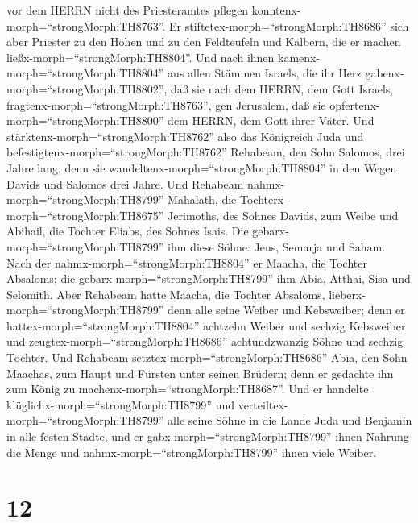 vor dem HERRN nicht des Priesteramtes pflegen
konntenx-morph=``strongMorph:TH8763''.  Er
stiftetex-morph=``strongMorph:TH8686'' sich aber Priester zu den Höhen
und zu den Feldteufeln und Kälbern, die er machen
ließx-morph=``strongMorph:TH8804''.  Und nach ihnen
kamenx-morph=``strongMorph:TH8804'' aus allen Stämmen Israels, die ihr
Herz gabenx-morph=``strongMorph:TH8802'', daß sie nach dem HERRN, dem
Gott Israels, fragtenx-morph=``strongMorph:TH8763'', gen Jerusalem, daß
sie opfertenx-morph=``strongMorph:TH8800'' dem HERRN, dem Gott ihrer
Väter.  Und stärktenx-morph=``strongMorph:TH8762'' also das
Königreich Juda und befestigtenx-morph=``strongMorph:TH8762'' Rehabeam,
den Sohn Salomos, drei Jahre lang; denn sie
wandeltenx-morph=``strongMorph:TH8804'' in den Wegen Davids und Salomos
drei Jahre.  Und Rehabeam
nahmx-morph=``strongMorph:TH8799'' Mahalath, die
Tochterx-morph=``strongMorph:TH8675'' Jerimoths, des Sohnes Davids, zum
Weibe und Abihail, die Tochter Eliabs, des Sohnes Isais. 
Die gebarx-morph=``strongMorph:TH8799'' ihm diese Söhne: Jeus, Semarja
und Saham.  Nach der nahmx-morph=``strongMorph:TH8804'' er
Maacha, die Tochter Absaloms; die gebarx-morph=``strongMorph:TH8799''
ihm Abia, Atthai, Sisa und Selomith.  Aber Rehabeam hatte
Maacha, die Tochter Absaloms, lieberx-morph=``strongMorph:TH8799'' denn
alle seine Weiber und Kebsweiber; denn er
hattex-morph=``strongMorph:TH8804'' achtzehn Weiber und sechzig
Kebsweiber und zeugtex-morph=``strongMorph:TH8686'' achtundzwanzig Söhne
und sechzig Töchter.  Und Rehabeam
setztex-morph=``strongMorph:TH8686'' Abia, den Sohn Maachas, zum Haupt
und Fürsten unter seinen Brüdern; denn er gedachte ihn zum König zu
machenx-morph=``strongMorph:TH8687''.  Und er handelte
klüglichx-morph=``strongMorph:TH8799'' und
verteiltex-morph=``strongMorph:TH8799'' alle seine Söhne in die Lande
Juda und Benjamin in alle festen Städte, und er
gabx-morph=``strongMorph:TH8799'' ihnen Nahrung die Menge und
nahmx-morph=``strongMorph:TH8799'' ihnen viele Weiber.

\hypertarget{section-11}{%
\section{12}\label{section-11}}

